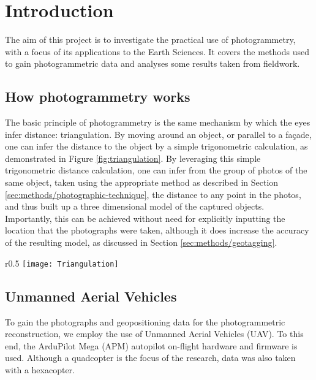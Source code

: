 \section{Introduction}

The aim of this project is to investigate the practical use of photogrammetry,
with a focus of its applications to the Earth Sciences. It covers the methods
used to gain photogrammetric data and analyses some results taken from
fieldwork.

\subsection{How photogrammetry works}

The basic principle of photogrammetry is the same mechanism by which the eyes
infer distance: triangulation. By moving around an object, or parallel to a
façade, one can infer the distance to the object by a simple trigonometric
calculation, as demonstrated in Figure \ref{fig:triangulation}. By leveraging
this simple trigonometric distance calculation, one can infer from the group of
photos of the same object, taken using the appropriate method as described in
Section \ref{sec:methods/photographic-technique}, the distance to any point in
the photos, and thus built up a three dimensional model of the captured objects.
Importantly, this can be achieved without need for explicitly inputting the
location that the photographs were taken, although it does increase the accuracy
of the resulting model, as discussed in Section \ref{sec:methods/geotagging}.

\begin{wrapfigure}{r}{0.5\textwidth}
    \texttt{[image: Triangulation]}
    \caption{By taking photographs of an object from different angles, one can
        use trigonometry to calculate the distance to that object.}
    \label{fig:triangulation}
\end{wrapfigure}

\subsection{Unmanned Aerial Vehicles}

To gain the photographs and geopositioning data for the photogrammetric
reconstruction, we employ the use of Unmanned Aerial Vehicles (UAV). To this
end, the ArduPilot Mega (APM) autopilot
on-flight hardware and firmware is used.  Although a quadcopter is the focus of
the research, data was also taken with a hexacopter.

